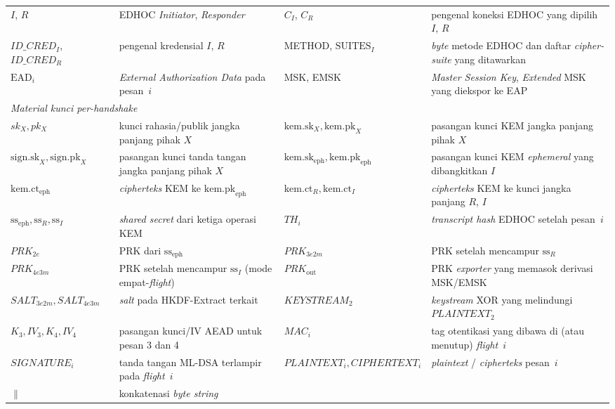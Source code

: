 \documentclass{easychair}
\begin{document}
\begin{table}[h]
\begin{tabularx}{\linewidth}{@{}l X l X@{}}
$I$, $R$ & EDHOC \emph{Initiator}, \emph{Responder} & $C_I$, $C_R$ & pengenal koneksi EDHOC yang dipilih $I$, $R$ \\
$ID\_CRED_I$, $ID\_CRED_R$ & pengenal kredensial $I$, $R$ & METHOD, $\mathrm{SUITES}_I$ & \emph{byte} metode EDHOC dan daftar \emph{cipher-suite} yang ditawarkan \\
$\mathrm{EAD}_i$ & \emph{External Authorization Data} pada pesan~$i$ & MSK, EMSK & \emph{Master Session Key}, \emph{Extended} MSK yang diekspor ke EAP \\
\midrule
\multicolumn{4}{l}{\textit{Material kunci per-\emph{handshake}}} \\
$sk_X, pk_X$ & kunci rahasia/publik jangka panjang pihak $X$ & $\mathrm{kem.sk}_X, \mathrm{kem.pk}_X$ & pasangan kunci KEM jangka panjang pihak $X$ \\
$\mathrm{sign.sk}_X, \mathrm{sign.pk}_X$ & pasangan kunci tanda tangan jangka panjang pihak $X$ & $\mathrm{kem.sk}_{\mathrm{eph}}, \mathrm{kem.pk}_{\mathrm{eph}}$ & pasangan kunci KEM \emph{ephemeral} yang dibangkitkan $I$ \\
$\mathrm{kem.ct}_{\mathrm{eph}}$ & \emph{cipherteks} KEM ke $\mathrm{kem.pk}_{\mathrm{eph}}$ & $\mathrm{kem.ct}_R, \mathrm{kem.ct}_I$ & \emph{cipherteks} KEM ke kunci jangka panjang $R$, $I$ \\
$\mathrm{ss}_{\mathrm{eph}}, \mathrm{ss}_R, \mathrm{ss}_I$ & \emph{shared secret} dari ketiga operasi KEM & $TH_i$ & \emph{transcript hash} EDHOC setelah pesan~$i$ \\
$PRK_{2e}$ & PRK dari $\mathrm{ss}_{\mathrm{eph}}$ & $PRK_{3e2m}$ & PRK setelah mencampur $\mathrm{ss}_R$ \\
$PRK_{4e3m}$ & PRK setelah mencampur $\mathrm{ss}_I$ (mode empat-\emph{flight}) & $PRK_{\mathrm{out}}$ & PRK \emph{exporter} yang memasok derivasi MSK/EMSK \\
$SALT_{3e2m}, SALT_{4e3m}$ & \emph{salt} pada HKDF-Extract terkait & $KEYSTREAM_2$ & \emph{keystream} XOR yang melindungi $PLAINTEXT_2$ \\
$K_3,IV_3,K_4,IV_4$ & pasangan kunci/IV AEAD untuk pesan 3 dan 4 & $MAC_i$ & tag otentikasi yang dibawa di (atau menutup) \emph{flight}~$i$ \\
$SIGNATURE_i$ & tanda tangan ML-DSA terlampir pada \emph{flight}~$i$ & $PLAINTEXT_i, CIPHERTEXT_i$ & \emph{plaintext} / \emph{cipherteks} pesan~$i$ \\
$\parallel$ & konkatenasi \emph{byte string} & & \\
\bottomrule
\end{tabularx}
\end{table}
\end{document}
